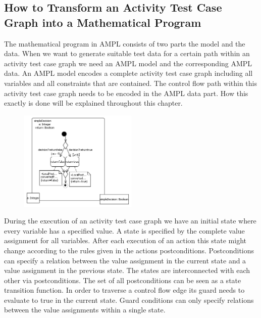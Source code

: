 \subsection{How to Transform an Activity Test Case Graph into a Mathematical Program}
The mathematical program in AMPL consists of two parts the model and the data. When we want to generate suitable test data for a certain path within an activity test case graph we need an AMPL model and the corresponding AMPL data. An AMPL model encodes a complete activity test case graph including all variables and all constraints that are contained. The control flow path within this activity test case graph needs to be encoded in the AMPL data part. How this exactly is done will be explained throughout this chapter.\\
\begin{figure}
\includegraphics[width=0.5\textwidth]{./pics/SomeActivityDiagrams.png}
\end{figure}
During the execution of an activity test case graph we have an initial state where every variable has a specified value. A state is specified by the complete value assignment for all variables. After each execution of an action this state might change according to the rules given in the actions postconditions. Postconditions can specify a relation between the value assignment in the current state and a value assignment in the previous state. The states are interconnected with each other via postconditions. The set of all postconditions can be seen as a state transition function. In order to traverse a control flow edge its guard needs to evaluate to true in the current state. Guard conditions can only specify relations between the value assignments within a single state.\\ 
